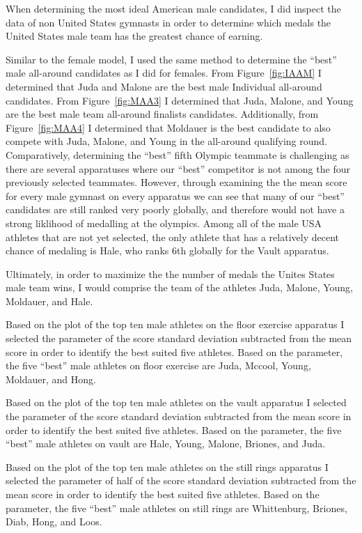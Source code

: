 \documentclass[12pt]{article}
\begin{document}
When determining the most ideal American male candidates, 
I did inspect the data of non United States gymnasts in order to determine which medals the United States 
male team has the greatest chance of earning. 

Similar to the female model, I used the same method to determine the ``best'' male all-around candidates as I did for females. From 
Figure~\ref{fig:IAAM} I determined that Juda and Malone are the best male Individual all-around candidates. From 
Figure~\ref{fig:MAA3} I determined that Juda, Malone, and Young are the best male team all-around finalists 
candidates. Additionally, from Figure~\ref{fig:MAA4} I determined that Moldauer is the best candidate to also compete 
with Juda, Malone, and Young in the all-around qualifying round. Comparatively, determining the ``best'' fifth Olympic 
teammate is challenging as there are several apparatuses where our ``best'' competitor is not among the four 
previously selected teammates. However, through examining the the mean score for every male gymnast on every apparatus 
we can see that many of our ``best'' candidates are still ranked very poorly globally, and therefore would not have a 
strong liklihood of medalling at the olympics. Among all of the male USA athletes that are not yet selected, the only 
athlete that has a relatively decent chance of medaling is Hale, who ranks 6th globally for the Vault apparatus.

Ultimately, in order to maximize the the number of medals the Unites States male team wins, I would comprise the 
team of the athletes Juda, Malone, Young, Moldauer, and Hale.

Based on the plot of the top ten male athletes on the floor exercise apparatus I selected the parameter of 
the score standard deviation subtracted from the mean score in order to identify the best suited five 
athletes. Based on the parameter, the five ``best'' male athletes on floor exercise are Juda, Mccool, Young, Moldauer, 
and Hong.

Based on the plot of the top ten male athletes on the vault apparatus I selected the parameter of 
the score standard deviation subtracted from the mean score in order to identify the best suited five 
athletes. Based on the parameter, the five ``best'' male athletes on vault are Hale, Young, Malone, Briones, and 
Juda.

Based on the plot of the top ten male athletes on the still rings apparatus I selected the parameter of 
half of the score standard deviation subtracted from the mean score in order to identify the best suited five 
athletes. Based on the parameter, the five ``best'' male athletes on still rings are Whittenburg, Briones, Diab, 
Hong, and Loos.
\end{document}
